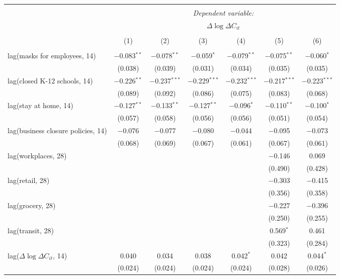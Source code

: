 \begin{tabular}{@{\extracolsep{1pt}}lcccccc} 
\\[-1.8ex]\hline 
\hline \\[-1.8ex] 
 & \multicolumn{6}{c}{\textit{Dependent variable:}} \\ 
\cline{2-7} 
 & \multicolumn{6}{c}{$\Delta \log \Delta C_{it}$} \\ 
\\[-1.8ex] & (1) & (2) & (3) & (4) & (5) & (6)\\ 
\hline \\[-1.8ex] 
 lag(masks for employees, 14) & $-$0.083$^{**}$ & $-$0.078$^{**}$ & $-$0.059$^{*}$ & $-$0.079$^{**}$ & $-$0.075$^{**}$ & $-$0.060$^{*}$ \\ 
  & (0.038) & (0.039) & (0.031) & (0.034) & (0.035) & (0.035) \\ 
  lag(closed K-12 schools, 14) & $-$0.226$^{**}$ & $-$0.237$^{***}$ & $-$0.229$^{***}$ & $-$0.232$^{***}$ & $-$0.217$^{***}$ & $-$0.223$^{***}$ \\ 
  & (0.089) & (0.092) & (0.086) & (0.075) & (0.083) & (0.068) \\ 
  lag(stay at home, 14) & $-$0.127$^{**}$ & $-$0.133$^{**}$ & $-$0.127$^{**}$ & $-$0.096$^{*}$ & $-$0.110$^{**}$ & $-$0.100$^{*}$ \\ 
  & (0.057) & (0.058) & (0.056) & (0.056) & (0.051) & (0.054) \\ 
  lag(business closure policies, 14) & $-$0.076 & $-$0.077 & $-$0.080 & $-$0.044 & $-$0.095 & $-$0.073 \\ 
  & (0.068) & (0.069) & (0.067) & (0.061) & (0.067) & (0.061) \\ 
  lag(workplaces, 28) &  &  &  &  & $-$0.146 & 0.069 \\ 
  &  &  &  &  & (0.490) & (0.428) \\ 
  lag(retail, 28) &  &  &  &  & $-$0.303 & $-$0.415 \\ 
  &  &  &  &  & (0.356) & (0.358) \\ 
  lag(grocery, 28) &  &  &  &  & $-$0.227 & $-$0.396 \\ 
  &  &  &  &  & (0.250) & (0.255) \\ 
  lag(transit, 28) &  &  &  &  & 0.569$^{*}$ & 0.461 \\ 
  &  &  &  &  & (0.323) & (0.284) \\ 
  lag($\Delta \log \Delta C_{it}$, 14) & 0.040 & 0.034 & 0.038 & 0.042$^{*}$ & 0.042 & 0.044$^{*}$ \\ 
  & (0.024) & (0.024) & (0.024) & (0.024) & (0.028) & (0.026) \\ 

\end{tabular}
